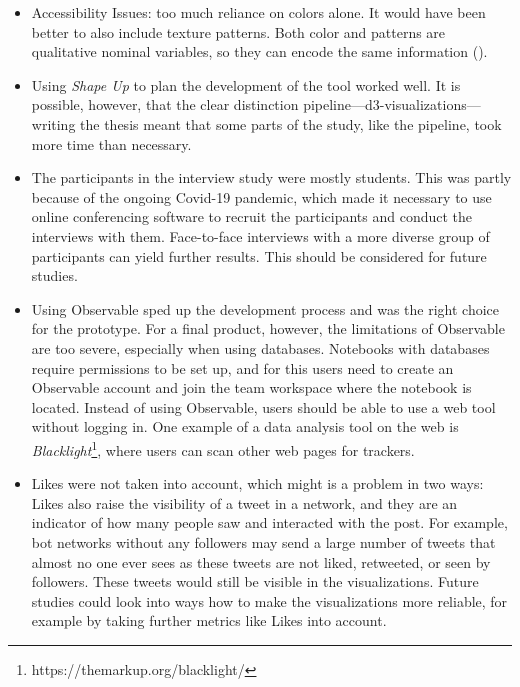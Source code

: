 \begin{itemize}
    \item Accessibility Issues: too much reliance on colors alone. It would have been better to also include texture patterns. Both color and patterns are qualitative nominal variables, so they can encode the same information (\cite[1860]{bornerDataVisualizationLiteracy2019}).
    \item Using \emph{Shape Up} to plan the development of the tool worked well. It is possible, however, that the clear distinction pipeline---d3-visualizations---writing the thesis meant that some parts of the study, like the pipeline, took more time than necessary.
    \item The participants in the interview study were mostly students. This was partly because of the ongoing Covid-19 pandemic, which made it necessary to use online conferencing software to recruit the participants and conduct the interviews with them. Face-to-face interviews with a more diverse group of participants can yield further results. This should be considered for future studies.
    \item Using Observable sped up the development process and was the right choice for the prototype. For a final product, however, the limitations of Observable are too severe, especially when using databases. Notebooks with databases require permissions to be set up, and for this users need to create an Observable account and join the team workspace where the notebook is located. Instead of using Observable, users should be able to use a web tool without logging in. One example of a data analysis tool on the web is \emph{Blacklight}\footnote{https://themarkup.org/blacklight/}, where users can scan other web pages for trackers.
    \item Likes were not taken into account, which might is a problem in two ways: Likes also raise the visibility of a tweet in a network, and they are an indicator of how many people saw and interacted with the post. For example, bot networks without any followers may send a large number of tweets that almost no one ever sees as these tweets are not liked, retweeted, or seen by followers. These tweets would still be visible in the visualizations. Future studies could look into ways how to make the visualizations more reliable, for example by taking further metrics like Likes into account.

\end{itemize}
